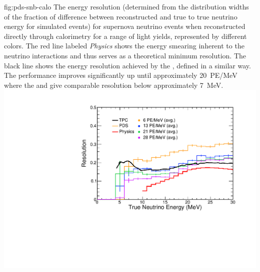 
\begin{dunefigure}
{fig:pds-snb-calo}
{The energy resolution (determined from the distribution widths of the fraction of difference between reconstructed and true to true neutrino energy for simulated events) for supernova neutrino events when reconstructed directly through  calorimetry for a range of light yields, represented by different colors. The red line labeled \textit{Physics} 
shows the energy smearing inherent to the neutrino interactions and thus serves as a theoretical minimum resolution. The black line shows the energy resolution achieved by the , defined in a similar way. The performance improves significantly up until approximately \SI{20}{PE/MeV} where the  and  give comparable resolution below approximately \SI{7}{MeV}.
}
  \includegraphics[width=0.6\columnwidth]{graphics/pds-snb-res-vs-true.pdf}
 \end{dunefigure}

